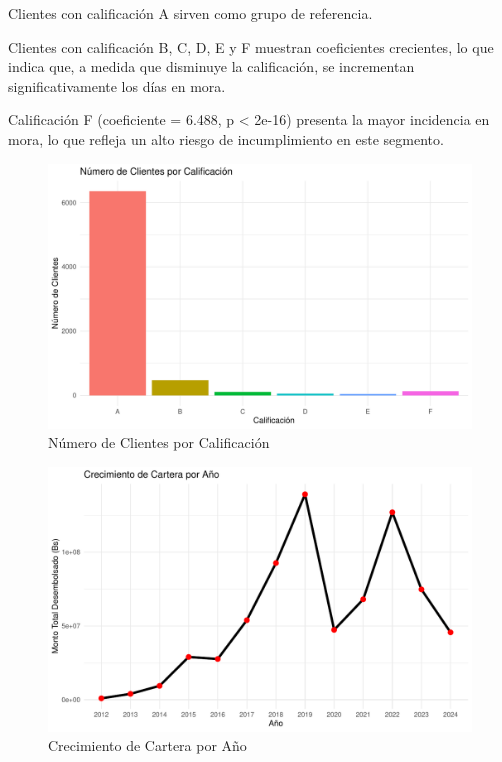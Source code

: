 \documentclass[Royal,times,sageh]{sagej}
\begin{document}
Clientes con calificación A sirven como grupo de referencia.

Clientes con calificación B, C, D, E y F muestran coeficientes
crecientes, lo que indica que, a medida que disminuye la calificación,
se incrementan significativamente los días en mora.

Calificación F (coeficiente = 6.488, p \textless{} 2e-16) presenta la
mayor incidencia en mora, lo que refleja un alto riesgo de
incumplimiento en este segmento.

\begin{figure}

{\centering \includegraphics[width=0.9\linewidth]{Mineria2_files/figure-latex/graficos_ajustados-1} 

}

\caption{Número de Clientes por Calificación}\label{fig:graficos_ajustados-1}
\end{figure}
\begin{figure}

{\centering \includegraphics[width=0.9\linewidth]{Mineria2_files/figure-latex/graficos_ajustados-2} 

}

\caption{Crecimiento de Cartera por Año}\label{fig:graficos_ajustados-2}
\end{figure}
\end{document}
